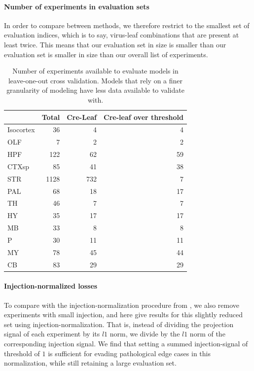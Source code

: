 \paragraph{Number of experiments in evaluation sets}

In order to compare between methods, we therefore restrict to the smallest set of evaluation indices, which is to say, virus-leaf combinations that are present at least twice. 
This means that our evaluation set in size is smaller than our evaluation set is smaller in size than our overall list of experiments.


\begin{table}[H]
\small
\begin{tabular}{lrrr}
\toprule
{} &  Total &  Cre-Leaf & Cre-leaf over threshold \\
\midrule
Isocortex &     36 &         4  & 4\\
OLF       &      7 &         2 & 2\\
HPF       &    122 &        62 & 59\\
CTXsp     &     85 &        41 & 38\\
STR       &   1128 &       732& 7 \\
PAL       &     68 &        18 & 17\\
TH        &     46 &         7& 7 \\
HY        &     35 &        17& 17 \\
MB        &     33 &         8 & 8\\
P         &     30 &        11& 11\\
MY        &     78 &        45 & 44\\
CB        &     83 &        29& 29 \\
\bottomrule
\end{tabular}
\caption{Number of experiments available to evaluate models in leave-one-out cross validation. 
Models that rely on a finer granularity of modeling have less data available to validate with.} 
\label{tab:eval_size}
\end{table}

\newpage

\paragraph{Injection-normalized losses}
To compare with the injection-normalization procedure from \citet{Knox2019-ot}, we also remove experiments with small injection, and here give results for this slightly reduced set using injection-normalization.
That is, instead of dividing the projection signal of each experiment by its $l1$ norm, we divide by the $l1$ norm of the corresponding injection signal.
We find that setting a summed injection-signal of threshold of $1$ is sufficient for evading pathological edge cases in this normalization, while still retaining a large evaluation set.

